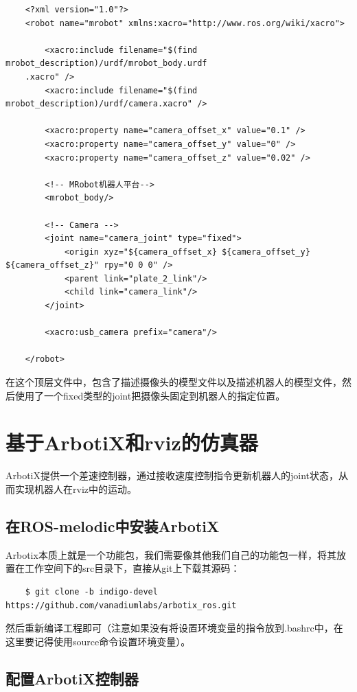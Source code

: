 \documentclass[10pt, oneside]{book}
\begin{document}
\begin{verbatim}
    <?xml version="1.0"?>
    <robot name="mrobot" xmlns:xacro="http://www.ros.org/wiki/xacro">

        <xacro:include filename="$(find mrobot_description)/urdf/mrobot_body.urdf
    .xacro" />
        <xacro:include filename="$(find mrobot_description)/urdf/camera.xacro" />

        <xacro:property name="camera_offset_x" value="0.1" />
        <xacro:property name="camera_offset_y" value="0" />
        <xacro:property name="camera_offset_z" value="0.02" />

        <!-- MRobot机器人平台-->
        <mrobot_body/>

        <!-- Camera -->
        <joint name="camera_joint" type="fixed">
            <origin xyz="${camera_offset_x} ${camera_offset_y} ${camera_offset_z}" rpy="0 0 0" />
            <parent link="plate_2_link"/>
            <child link="camera_link"/>
        </joint>

        <xacro:usb_camera prefix="camera"/>

    </robot>
\end{verbatim}

在这个顶层文件中，包含了描述摄像头的模型文件以及描述机器人的模型文件，然后使用了一个fixed类型的joint把摄像头固定到机器人的指定位置。

\section{基于ArbotiX和rviz的仿真器}

ArbotiX提供一个差速控制器，通过接收速度控制指令更新机器人的joint状态，从而实现机器人在rviz中的运动。

\subsection{在ROS-melodic中安装ArbotiX}

Arbotix本质上就是一个功能包，我们需要像其他我们自己的功能包一样，将其放置在工作空间下的src目录下，直接从git上下载其源码：

\begin{verbatim}
    $ git clone -b indigo-devel https://github.com/vanadiumlabs/arbotix_ros.git
\end{verbatim}

然后重新编译工程即可（注意如果没有将设置环境变量的指令放到.bashrc中，在这里要记得使用source命令设置环境变量）。

\subsection{配置ArbotiX控制器}
\end{document}
